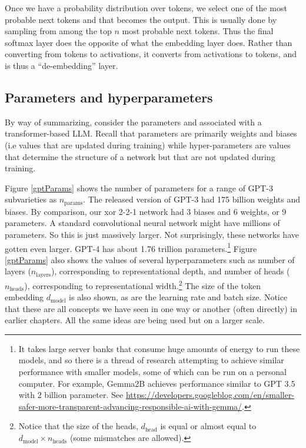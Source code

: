 Once we have a probability distribution over tokens, we select one of the most probable next tokens and that becomes the output. This is usually done by sampling from among the top $n$ most probable next tokens. Thus the final softmax layer does the opposite of what the embedding layer does. Rather than converting from tokens to activations, it converts from activations to tokens, and is thus a ``de-embedding'' layer.

\subsection{Parameters and hyperparameters}

By way of summarizing, consider the parameters and   associated with a transformer-based LLM. Recall that parameters are primarily weights and biases (i.e values that are updated during training) while hyper-parameters are values that determine the structure of a network but that are not updated during training.

Figure \ref{gptParams} shows the  number of parameters for a range of GPT-3 subvarieties as $n_\text{params}$. The released version of GPT-3 had 175 billion weights and biases. By comparison, our xor 2-2-1 network had 3 biases and 6 weights, or 9 parameters. A standard convolutional neural network might have millions of parameters. So this is just massively larger. Not surprisingly, these networks have gotten even larger. GPT-4 has about 1.76 trillion parameters.\footnote{It takes large server banks that  consume huge amounts of energy to run these models, and so there is a thread of research attempting to achieve similar performance with smaller models, some of which can be run on a  personal computer. For example, Gemma2B achieves performance similar to GPT 3.5 with 2 billion parameter. See \url{https://developers.googleblog.com/en/smaller-safer-more-transparent-advancing-responsible-ai-with-gemma/}.} Figure \ref{gptParams} also shows the values of several hyperparameters such as number of layers ($n_\text{layers}$), corresponding to representational depth, and number of heads ($n_\text{heads}$), corresponding to representational width.\footnote{Notice that the size of the heads, $d_\text{head}$ is equal or almost equal to  $d_\text{model} \times n_\text{heads}$ (some mismatches are allowed).} The size of the token embedding  $d_\text{model}$ is also shown, as are the learning rate and batch size. Notice that these are all concepts we have seen in one way or another (often directly) in earlier chapters. All the same ideas are being used but on a larger scale.

